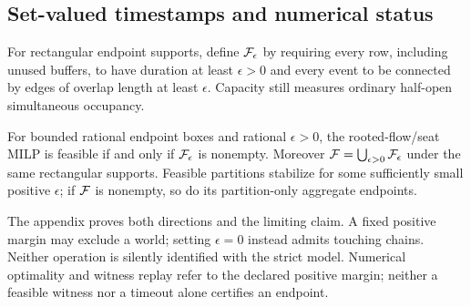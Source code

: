 \subsection{Set-valued timestamps and numerical status}
For rectangular endpoint supports, define $\mathcal F_\epsilon$ by requiring every
row, including unused buffers, to have duration at least $\epsilon>0$ and
every event to be connected by edges of overlap length at least $\epsilon$.
Capacity still measures ordinary half-open simultaneous occupancy.

\begin{proposition}
\label{prop:epsilon}
For bounded rational endpoint boxes and rational $\epsilon>0$, the
rooted-flow/seat MILP is feasible if and only if $\mathcal F_\epsilon$ is nonempty.
Moreover $\mathcal F=\bigcup_{\epsilon>0}\mathcal F_\epsilon$ under the same rectangular
supports. Feasible partitions stabilize for some sufficiently small positive
$\epsilon$; if $\mathcal F$ is nonempty, so do its partition-only aggregate endpoints.
\end{proposition}
The appendix proves both directions and the limiting claim. A fixed positive
margin may exclude a world; setting $\epsilon=0$ instead admits touching
chains. Neither operation is silently identified with the strict model.
Numerical optimality and witness replay refer to the declared positive margin;
neither a feasible witness nor a timeout alone certifies an endpoint.
